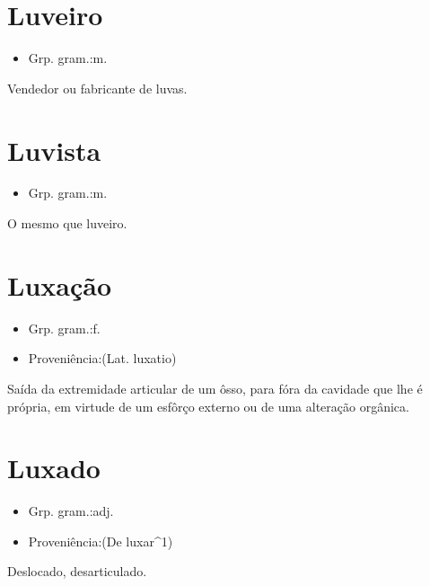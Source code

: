 \section{Luveiro}
\begin{itemize}
\item {Grp. gram.:m.}
\end{itemize}
Vendedor ou fabricante de luvas.
\section{Luvista}
\begin{itemize}
\item {Grp. gram.:m.}
\end{itemize}
O mesmo que \textunderscore luveiro\textunderscore .
\section{Luxação}
\begin{itemize}
\item {Grp. gram.:f.}
\end{itemize}
\begin{itemize}
\item {Proveniência:(Lat. \textunderscore luxatio\textunderscore )}
\end{itemize}
Saída da extremidade articular de um ôsso, para fóra da cavidade que lhe é própria, em virtude de um esfôrço externo ou de uma alteração orgânica.
\section{Luxado}
\begin{itemize}
\item {Grp. gram.:adj.}
\end{itemize}
\begin{itemize}
\item {Proveniência:(De \textunderscore luxar\textunderscore ^1)}
\end{itemize}
Deslocado, desarticulado.
